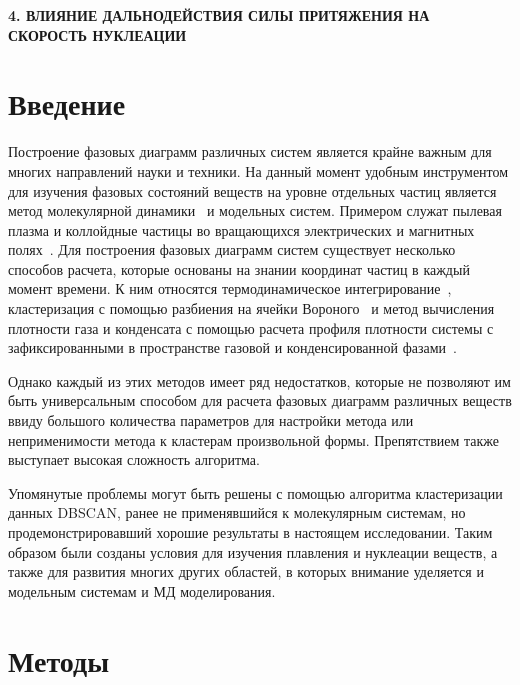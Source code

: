 \newpage
\begin{center}
  \textbf{\large 4. ВЛИЯНИЕ ДАЛЬНОДЕЙСТВИЯ СИЛЫ ПРИТЯЖЕНИЯ НА СКОРОСТЬ НУКЛЕАЦИИ}
\end{center}

\section{Введение}
\label{PRIMe-SecIntroduction}

Построение фазовых диаграмм различных систем является крайне важным для многих направлений науки и техники.
На данный момент удобным инструментом для изучения фазовых состояний веществ на уровне отдельных частиц является метод молекулярной динамики~\cite{10.1063/1.1730376, 10.1006/jcph.1995.1039} и модельных систем.
Примером служат пылевая плазма и коллойдные частицы во вращающихся электрических и магнитных полях~\cite{10.1038/s41598-017-14001-y, 10.1103/physreve.103.022608, 10.1103/physreve.96.043201}.
Для построения фазовых диаграмм систем существует несколько способов расчета, которые основаны на знании координат частиц в каждый момент времени.
К ним относятся термодинамическое интегрирование~\cite{10.1088/0953-8984/21/46/465104}, кластеризация с помощью разбиения на ячейки Вороного~\cite{10.1021/acs.jpcc.7b09317} и метод вычисления плотности газа и конденсата с помощью расчета профиля плотности системы с зафиксированными в пространстве газовой и конденсированной фазами~\cite{10.1021/jp806127j, 10.1021/jp1117213}.

Однако каждый из этих методов имеет ряд недостатков, которые не позволяют им быть универсальным способом для расчета фазовых диаграмм различных веществ ввиду большого количества параметров для настройки метода или неприменимости метода к кластерам произвольной формы.
Препятствием также выступает высокая сложность алгоритма.

Упомянутые проблемы могут быть решены с помощью алгоритма кластеризации данных DBSCAN, ранее не применявшийся к молекулярным системам, но продемонстрировавший хорошие результаты в настоящем исследовании.
Таким образом были созданы условия для изучения плавления и нуклеации веществ, а также для развития многих других областей, в которых внимание уделяется и модельным системам и МД моделирования.


\section{Методы}
\label{PRIMe-SecMethods}

